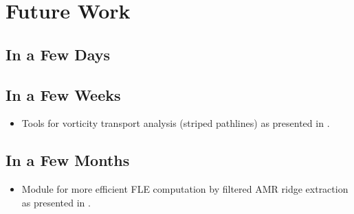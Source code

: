 \section{Future Work}
\label{sec:future}


\subsection{In a Few Days}



\subsection{In a Few Weeks}
  
\begin{itemize}

\item
  Tools for vorticity transport analysis (striped pathlines) as presented in \cite{Sadlo06vorticity}.

\end{itemize}


\subsection{In a Few Months}
  
\begin{itemize}

\item
  Module for more efficient FLE computation by filtered AMR ridge extraction as presented in \cite{Sadlo07ARidges}.

\end{itemize}
